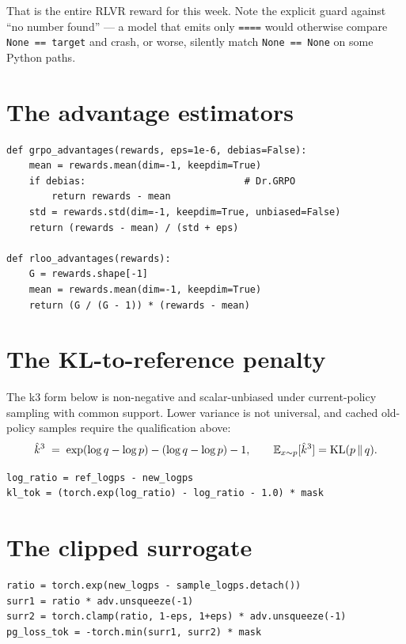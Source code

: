 \documentclass[11pt,oneside]{scrbook}
\begin{document}
That is the entire RLVR reward for this week. Note the explicit guard
against ``no number found'' --- a model that emits only \texttt{====} would
otherwise compare \texttt{None == target} and crash, or worse, silently
match \texttt{None == None} on some Python paths.

\section{The advantage estimators}

\begin{verbatim}
def grpo_advantages(rewards, eps=1e-6, debias=False):
    mean = rewards.mean(dim=-1, keepdim=True)
    if debias:                            # Dr.GRPO
        return rewards - mean
    std = rewards.std(dim=-1, keepdim=True, unbiased=False)
    return (rewards - mean) / (std + eps)

def rloo_advantages(rewards):
    G = rewards.shape[-1]
    mean = rewards.mean(dim=-1, keepdim=True)
    return (G / (G - 1)) * (rewards - mean)
\end{verbatim}

\section{The KL-to-reference penalty}

The k3 form below is non-negative and scalar-unbiased under current-policy sampling with common support. Lower variance is not universal, and cached old-policy samples require the qualification above:
\[
  \hat k^3 \;=\; \exp(\log q - \log p) - (\log q - \log p) - 1,
  \qquad \mathbb{E}_{x \sim p}[\hat k^3] = \mathrm{KL}(p \,\|\, q).
\]

\begin{verbatim}
log_ratio = ref_logps - new_logps
kl_tok = (torch.exp(log_ratio) - log_ratio - 1.0) * mask
\end{verbatim}

\section{The clipped surrogate}

\begin{verbatim}
ratio = torch.exp(new_logps - sample_logps.detach())
surr1 = ratio * adv.unsqueeze(-1)
surr2 = torch.clamp(ratio, 1-eps, 1+eps) * adv.unsqueeze(-1)
pg_loss_tok = -torch.min(surr1, surr2) * mask
\end{verbatim}
\end{document}
